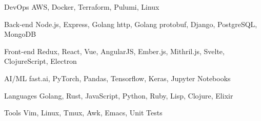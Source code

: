 

\begin{cvskills}

  \cvskill
    {DevOps} %
    {AWS, Docker, Terraform, Pulumi, Linux} %

  \cvskill
    {Back-end} %
    {Node.js, Express, Golang http, Golang protobuf, Django, PostgreSQL, MongoDB} %

  \cvskill
    {Front-end} %
    {Redux, React, Vue, AngularJS, Ember.js, Mithril.js, Svelte, ClojureScript, Electron} %

  \cvskill
    {AI/ML} %
    {fast.ai, PyTorch, Pandas, Tensorflow, Keras, Jupyter Notebooks} %

  \cvskill
    {Languages} %
    {Golang, Rust, JavaScript, Python, Ruby, Lisp, Clojure, Elixir} %

  \cvskill
    {Tools} %
    {Vim, Linux, Tmux, Awk, Emacs, Unit Tests} %


\end{cvskills}
